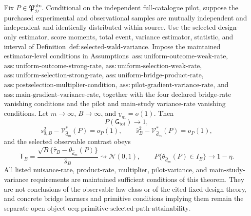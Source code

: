 Fix \(P\in\mathfrak P_{\mathcal D}^{\mathrm{obs}}\). Conditional on the independent full-catalogue pilot, suppose the purchased experimental and observational samples are mutually independent and independent and identically distributed within source. Use the selected-design-only estimator, score moments, total event, variance estimator, statistic, and interval of Definition~\(\mathrm{def{:}selected\text{-}wald\text{-}variance}\). Impose the maintained estimator-level conditions in Assumptions~\(\mathrm{ass{:}uniform\text{-}outcome\text{-}weak\text{-}rate}\), \(\mathrm{ass{:}uniform\text{-}outcome\text{-}strong\text{-}rate}\), \(\mathrm{ass{:}uniform\text{-}selection\text{-}weak\text{-}rate}\), \(\mathrm{ass{:}uniform\text{-}selection\text{-}strong\text{-}rate}\), \(\mathrm{ass{:}uniform\text{-}bridge\text{-}product\text{-}rate}\), \(\mathrm{ass{:}postselection\text{-}multiplier\text{-}condition}\), \(\mathrm{ass{:}pilot\text{-}gradient\text{-}variance\text{-}rate}\), and \(\mathrm{ass{:}main\text{-}gradient\text{-}variance\text{-}rate}\), together with the four declared bridge-rate vanishing conditions and the pilot and main-study variance-rate vanishing conditions. Let \(m\to\infty\), \(B\to\infty\), and \(\underline v_m=o(1)\). Then
\[
 P(\mathsf G_{\mathrm{tot}})\longrightarrow1,
\]
\[
 s_{0,B}^2-\mathcal V_{\widehat d_m}^*(P)=o_P(1),
 \qquad
 \widehat s_B^2-\mathcal V_{\widehat d_m}^*(P)=o_P(1),
\]
and the selected observable contrast obeys
\[
 \mathsf T_B=
 \frac{\sqrt B\{\widehat\tau_B-\theta_{\widehat d_m}(P)\}}{\widehat s_B}
 \rightsquigarrow\mathcal N(0,1),
 \qquad
 P\{\theta_{\widehat d_m}(P)\in I_B\}\longrightarrow1-\eta.
\]
All listed nuisance-rate, product-rate, multiplier, pilot-variance, and main-study-variance requirements are maintained sufficient conditions of this theorem. They are not conclusions of the observable law class or of the cited fixed-design theory, and concrete bridge learners and primitive conditions implying them remain the separate open object \(\mathrm{oeq{:}primitive\text{-}selected\text{-}path\text{-}attainability}\).